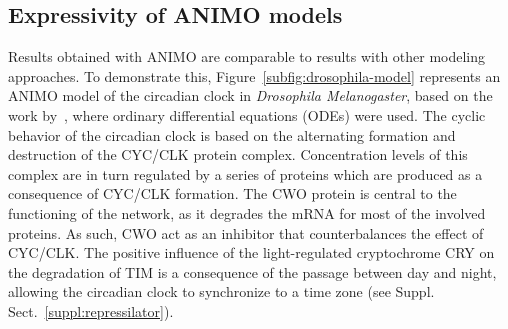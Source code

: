 \subsection{Expressivity of ANIMO models}\label{sec:animo-drosophila}
Results obtained with ANIMO are comparable to results with other modeling
approaches. To demonstrate this, Figure~\ref{subfig:drosophila-model}
represents an ANIMO model of the circadian clock in \emph{Drosophila Melanogaster}, based on the work 
by~\cite{drosophila-ode-model}, where ordinary differential equations (ODEs) were used.
The cyclic behavior of the circadian clock is based on the alternating formation and destruction of the 
CYC/CLK protein complex.
Concentration levels of this complex are in turn regulated by a series of proteins which are produced as 
a consequence of CYC/CLK formation. The CWO protein
is central to the functioning of the network, as it degrades the mRNA for most of the involved proteins. 
As such, CWO act as an inhibitor that counterbalances the effect of CYC/CLK.
The positive influence of the light-regulated cryptochrome CRY on the degradation of TIM is a consequence 
of the passage between day and night, allowing
the circadian clock to synchronize to a time zone (see Suppl. Sect.~\ref{suppl:repressilator}).


\def\drosophilaGraphScale{0.069}%

